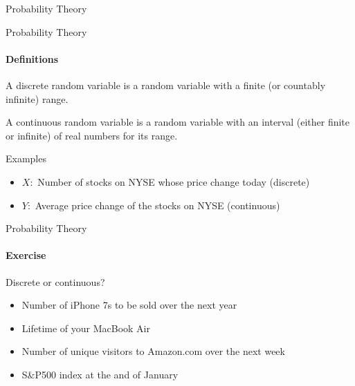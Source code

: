 \documentclass{beamer}\usepackage[]{graphicx}\usepackage[]{color}
\begin{document}
\begin{darkframes}
\begin{frame}[label=lists]{Probability Theory}
				
    \end{frame}
    
       
    

    \begin{frame}[label=lists]{Probability Theory}
		\framesubtitle{Definitions}    
      	
      	\begin{definition}
       		A \alert{discrete random variable} is a random variable with a finite (or countably infinite) range. 
       		
       		A \alert{continuous random variable} is a random variable with an interval (either finite or infinite) of real numbers for its range.
      	\end{definition}
    
    
    	\begin{exampleblock}{Examples}
      		\begin{itemize}

				\item $X:$ Number of stocks on NYSE whose price change today (discrete)
				\item $Y:$ Average price change of the stocks on NYSE (continuous)

			\end{itemize}
        \end{exampleblock}
  
	\end{frame}  
	
	
	
   \begin{frame}[label=lists]{Probability Theory}
		\framesubtitle{Exercise}    
      	Discrete or continuous?
      		\begin{itemize}
				
				\item Number of iPhone 7s to be sold over the next year
				\item Lifetime of your MacBook Air
				\item Number of unique visitors to Amazon.com over the next week
      			\item S\&P500 index at the and of January %
    
			\end{itemize}
	\end{frame} 
	

\end{darkframes}
\end{document}
